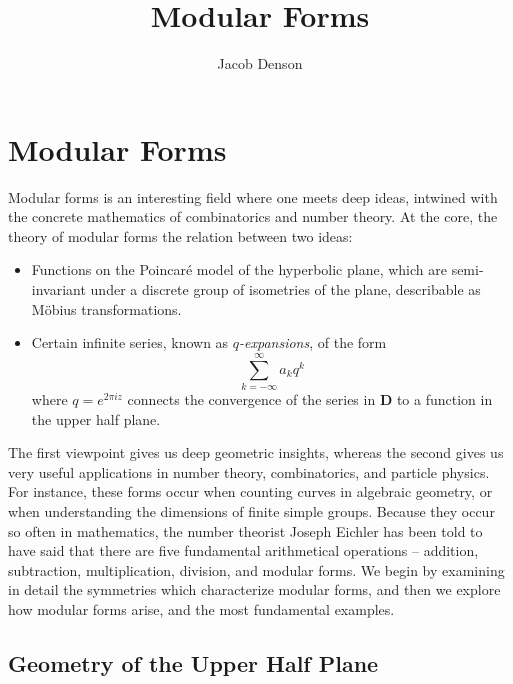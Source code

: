 

\title{Modular Forms}
\author{Jacob Denson}




\maketitle

\tableofcontents


\chapter{Modular Forms}

Modular forms is an interesting field where one meets deep ideas, intwined with the concrete mathematics of combinatorics and number theory. At the core, the theory of modular forms the relation between two ideas:
%
\begin{itemize}
    \item Functions on the Poincar\'{e} model of the hyperbolic plane, which are semi-invariant under a discrete group of isometries of the plane, describable as M\"{o}bius transformations.

    \item Certain infinite series, known as {\it $q$-expansions}, of the form
    \[ \sum_{k = -\infty}^\infty a_k q^k \]
    where $q = e^{2 \pi i z}$ connects the convergence of the series in $\mathbf{D}$ to a function in the upper half plane.
\end{itemize}
%
The first viewpoint gives us deep geometric insights, whereas the second gives us very useful applications in number theory, combinatorics, and particle physics. For instance, these forms occur when counting curves in algebraic geometry, or when understanding the dimensions of finite simple groups. Because they occur so often in mathematics, the number theorist Joseph Eichler has been told to have said that there are five fundamental arithmetical operations -- addition, subtraction, multiplication, division, and modular forms. We begin by examining in detail the symmetries which characterize modular forms, and then we explore how modular forms arise, and the most fundamental examples.

\section{Geometry of the Upper Half Plane}


